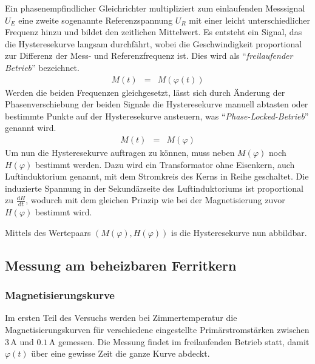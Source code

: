 \documentclass[12pt,a4paper]{scrartcl}
\numberwithin{equation}{section} %
\begin{document}
\hypertarget{bestimmung-von-mvarphi}{\label{bestimmung-von-mvarphi}}
Ein phasenempfindlicher Gleichrichter multipliziert zum einlaufenden Messsignal $U_E$ eine zweite sogenannte Referenzspannung $U_R$ mit einer leicht unterschiedlicher Frequenz hinzu und bildet den zeitlichen Mittelwert. Es entsteht ein Signal, das die Hysteresekurve langsam durchfährt, wobei die Geschwindigkeit proportional zur Differenz der Mess- und Referenzfrequenz ist. Dies wird als ``\emph{freilaufender Betrieb}'' bezeichnet.
\begin{eqnarray}
    M(t) &=& M(\varphi(t))
\end{eqnarray}
Werden die beiden Frequenzen gleichgesetzt, lässt sich durch Änderung der Phasenverschiebung der beiden Signale die Hysteresekurve manuell abtasten oder bestimmte Punkte auf der Hysteresekurve ansteuern, was ``\emph{Phase-Locked-Betrieb}'' genannt wird.
\begin{eqnarray}
    M(t) &=& M(\varphi)
\end{eqnarray}
\hypertarget{bestimmung-von-hvarphi}{\label{bestimmung-von-hvarphi}}Um nun die Hysteresekurve auftragen zu können, muss neben $M(\varphi)$ noch $H(\varphi)$ bestimmt werden. Dazu wird ein Transformator ohne Eisenkern, auch Luftinduktorium genannt, mit dem Stromkreis des Kerns in Reihe geschaltet. Die induzierte Spannung in der Sekundärseite des Luftinduktoriums ist proportional zu $\frac{\mathrm dH}{\mathrm dt}$, wodurch mit dem gleichen Prinzip wie bei der Magnetisierung zuvor $H(\varphi)$ bestimmt wird.

Mittels des Wertepaars $(M(\varphi), H(\varphi))$ is die Hysteresekurve nun abbildbar.

\hypertarget{messung-am-beheizbaren-ferritkern}{%
\subsection{Messung am beheizbaren Ferritkern}\label{messung-am-beheizbaren-ferritkern}}

\hypertarget{magnetisierungskurve}{%
\subsubsection{Magnetisierungskurve}\label{magnetisierungskurve}}
Im ersten Teil des Versuchs werden bei Zimmertemperatur die Magnetisierungskurven für verschiedene eingestellte Primärstromstärken zwischen $3\,\mathrm A$ und $0.1\,\mathrm A$ gemessen. Die Messung findet im freilaufenden Betrieb statt, damit $\varphi(t)$ über eine gewisse Zeit die ganze Kurve abdeckt.
\end{document}
